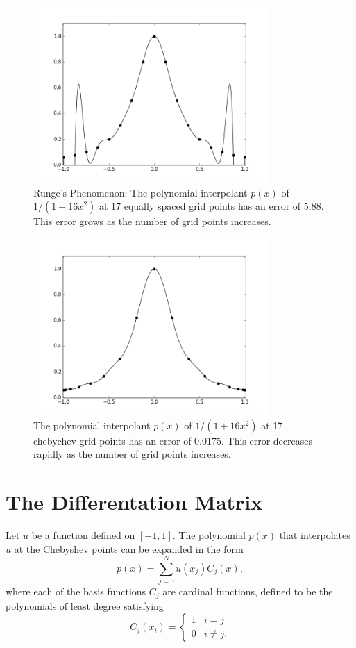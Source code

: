 \begin{figure}[ht]
\centering
\includegraphics[width=9cm]{equally_spaced_points.png}
\caption{Runge's Phenomenon: The polynomial interpolant $p(x)$ of  $1/(1+16x^2)$ at 17 equally spaced grid points has an error of 5.88. This error grows as the number of grid points increases.}
\label{Spectral1:equally_spaced_points}
\end{figure}

\begin{figure}[ht]
\centering
\includegraphics[width=9cm]{chebychev_points.png}
\caption{The polynomial interpolant $p(x)$ of $1/(1+16x^2)$ at 17 chebychev grid points has an error of 0.0175. This error decreases rapidly as the number of grid points increases.}
\label{Spectral1:chebychev_points}
\end{figure}


\section{The Differentation Matrix}
Let $u$ be a function defined on $[-1,1]$. The polynomial $p(x)$ that interpolates $u$ at the Chebyshev points can be expanded in the form 
\[p(x) = \sum_{j=0}^N u(x_j)C_j(x),\]
where each of the basis functions $C_j$ are cardinal functions, defined to be the polynomials of least degree satisfying
\begin{equation*}
C_j(x_i) = \begin{cases} 1 & i=j \\ 0 & i \not = j.
   \end{cases}
\end{equation*}

